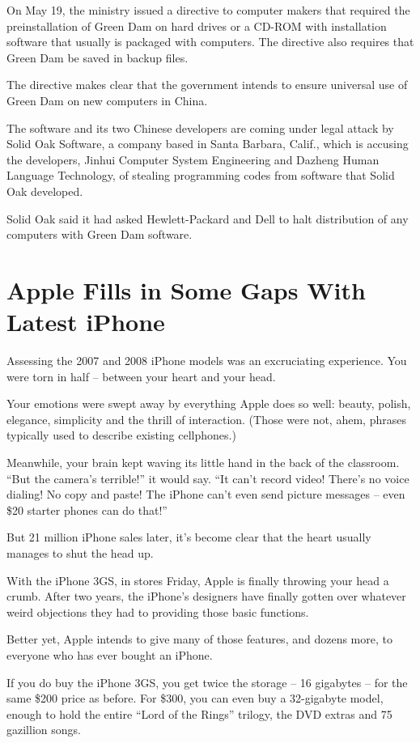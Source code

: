 ﻿\documentclass[12pt,a4paper,onecolumn]{article}
\begin{document}
On May 19, the ministry issued a directive to computer makers that required the preinstallation of Green Dam on hard drives or a CD-ROM with installation software that usually is packaged with computers. The directive also requires that Green Dam be saved in backup files.

The directive makes clear that the government intends to ensure universal use of Green Dam on new computers in China.

The software and its two Chinese developers are coming under legal attack by Solid Oak Software, a
company based in Santa Barbara, Calif., which is accusing the developers, Jinhui Computer System
Engineering and Dazheng Human Language Technology, of stealing programming codes from software that
Solid Oak developed.

Solid Oak said it had asked Hewlett-Packard and Dell to halt distribution of any computers with
Green Dam software.

\section{Apple Fills in Some Gaps With Latest iPhone}

Assessing the 2007 and 2008 iPhone models was an excruciating experience. You were torn in half --
between your heart and your head.

Your emotions were swept away by everything Apple does so well: beauty, polish, elegance, simplicity
and the thrill of interaction. (Those were not, ahem, phrases typically used to describe existing
cellphones.)

Meanwhile, your brain kept waving its little hand in the back of the classroom. ``But the camera's
terrible!'' it would say. ``It can't record video! There's no voice dialing! No copy and paste! The
iPhone can't even send picture messages -- even \$20 starter phones can do that!''

But 21 million iPhone sales later, it's become clear that the heart usually manages to shut the head
up.

With the iPhone 3GS, in stores Friday, Apple is finally throwing your head a crumb. After two
years, the iPhone's designers have finally gotten over whatever weird objections they had to
providing those basic functions.

Better yet, Apple intends to give many of those features, and dozens more, to everyone who has ever
bought an iPhone.

If you do buy the iPhone 3GS, you get twice the storage -- 16 gigabytes -- for the same \$200 price
as before. For \$300, you can even buy a 32-gigabyte model, enough to hold the entire ``Lord of the
Rings'' trilogy, the DVD extras and 75 gazillion songs.
\end{document}
